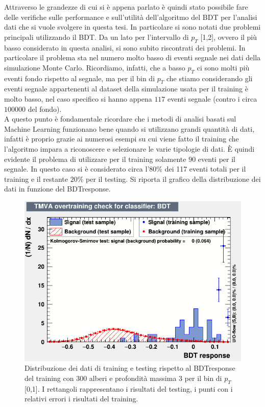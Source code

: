 Attraverso le grandezze di cui si è appena parlato è quindi stato possibile fare delle verifiche sulle performance e sull'utilità dell'algoritmo del BDT per l'analisi dati che si vuole svolgere in questa tesi. In particolare si sono notati due problemi principali utilizzando il BDT. Da un lato per l'intervallo di $p_T$ [1,2], ovvero il più basso considerato in questa analisi, si sono subito riscontrati dei problemi.  In particolare il problema sta nel numero molto basso di eventi segnale nei dati della simulazione Monte Carlo. Ricordiamo, infatti, che a basso $p_T$ ci sono molti più eventi fondo rispetto al segnale, ma per il bin di $p_T$ che stiamo considerando gli eventi segnale appartenenti al dataset della simulazione usata per il training è molto basso, nel caso specifico si hanno appena $117$ eventi segnale (contro i circa $100000$ del fondo). 
\\A questo punto è fondamentale ricordare che i metodi di analisi basati sul Machine Learning funzionano bene quando si utilizzano grandi quantità di dati, infatti è proprio grazie ai numerosi esempi su cui viene fatto il training che l'algoritmo impara a riconoscere e selezionare le varie tipologie di dati. 
È quindi evidente il problema di utilizzare per il training solamente $90$ eventi per il segnale. In questo caso si è considerato circa l'$80\%$ dei 117 eventi totali per il training e il restante $20\%$ per il testing. Si riporta il grafico della distribuzione dei dati in funzione del BDTresponse. 

 \begin{figure}[htbp] 
        \centering
        \includegraphics[width=0.7\linewidth]{training&testing/BDTresponse_0_1.png}
        \caption{Distribuzione dei dati di training e testing rispetto al BDTresponse del training con 300 alberi e profondità massima 3 per il bin di $p_T$ [0,1]. I rettangoli rappresentano i risultati del testing, i punti con i relativi errori i risultati del training.
        }
        \label{fig:BDTresponse_0_1}
    \end{figure}
    
